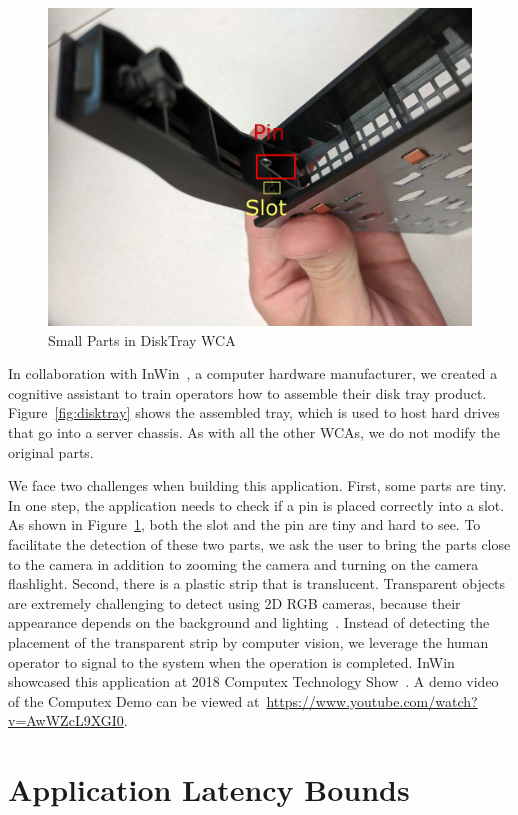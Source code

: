 \begin{figure}
    \centering
    \includegraphics[width=0.5\linewidth]{FIGS/disktray-challenge.jpg}
    \caption{Small Parts in DiskTray WCA}
    \label{fig:disktray-challenge}
\end{figure}

In collaboration with InWin~\cite{inwin}, a computer hardware manufacturer, we
created a cognitive assistant to train operators how to assemble their disk
tray product. Figure~\ref{fig:disktray} shows the assembled tray, which is used
to host hard drives that go into a server chassis. As with all the other WCAs,
we do not modify the original parts.

We face two challenges when building this application. First, some parts are
tiny. In one step, the application needs to check if a pin is placed correctly
into a slot. As shown in Figure~\ref{fig:disktray-challenge}, both the slot and
the pin are tiny and hard to see. To facilitate the detection of these two
parts, we ask the user to bring the parts close to the camera in addition to
zooming the camera and turning on the camera flashlight. Second, there is a
plastic strip that is translucent. Transparent objects are extremely challenging
to detect using 2D RGB cameras, because their appearance depends on the
background and lighting~\cite{lysenkov2013recognition}. Instead of detecting the
placement of the transparent strip by computer vision, we leverage the human
operator to signal to the system when the operation is completed. InWin
showcased this application at 2018 Computex Technology Show~\cite{computex}. A
demo video of the Computex Demo can be viewed
at~\url{https://www.youtube.com/watch?v=AwWZcL9XGI0}.


\section{Application Latency Bounds}

